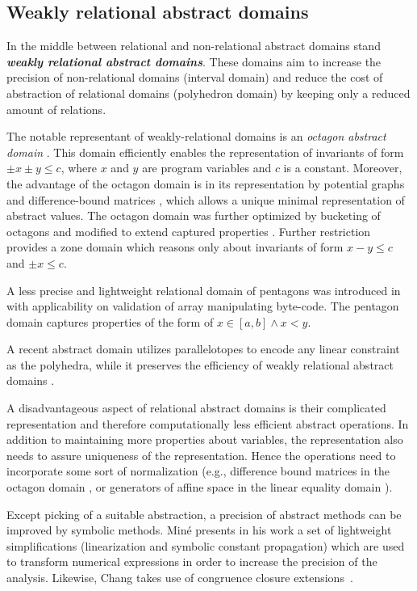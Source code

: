 \subsection{Weakly relational abstract domains}

In the middle between relational and non-relational abstract domains stand
\textbf{\emph{weakly relational abstract domains}}. These domains aim to
increase the precision of non-relational domains (interval domain) and reduce
the cost of abstraction of relational domains (polyhedron domain) by keeping
only a reduced amount of relations.

The notable representant of weakly-relational domains is an \emph{octagon
abstract domain} \cite{Mine2006}. This domain efficiently enables the representation
of invariants of form $\pm x \pm y \leq c$, where $x$ and $y$ are program
variables and $c$ is a constant.  Moreover, the advantage of the octagon domain
is in its representation by potential graphs and difference-bound matrices
\cite{Larsen1997}, which allows a unique minimal representation of abstract
values. The octagon domain was further optimized by bucketing of octagons
\cite{Blanchet2003, Venet2004} and modified to extend captured properties
\cite{Claris2004, Mine2004}. Further restriction provides a zone domain
\cite{Mine2001} which reasons only about invariants of form $x - y \leq c$ and
$\pm x \leq c$.

A less precise and lightweight relational domain of pentagons was introduced in
\cite{Logozzo2010} with applicability on validation of array manipulating
byte-code. The pentagon domain captures properties of the form of $x \in [a,b]
\wedge x < y$.

A recent abstract domain utilizes parallelotopes to encode any linear
constraint as the polyhedra, while it preserves the efficiency of weakly
relational abstract domains \cite{Amato2017}.

A disadvantageous aspect of relational abstract domains is their complicated
representation and therefore computationally less efficient abstract
operations. In addition to maintaining more properties about variables, the
representation also needs to assure uniqueness of the representation. Hence the
operations need to incorporate some sort of normalization (e.g., difference
bound matrices in the octagon domain \cite{Mine2006}, or generators of affine
space in the linear equality domain \cite{Karr1976}).

Except picking of a suitable abstraction, a precision of abstract methods can
be improved by symbolic methods. Miné presents in his work \cite{Mine2006b} a
set of lightweight simplifications (linearization and symbolic constant
propagation) which are used to transform numerical expressions in order to
increase the precision of the analysis. Likewise, Chang takes use of congruence
closure extensions~\cite{Chang2005}.

